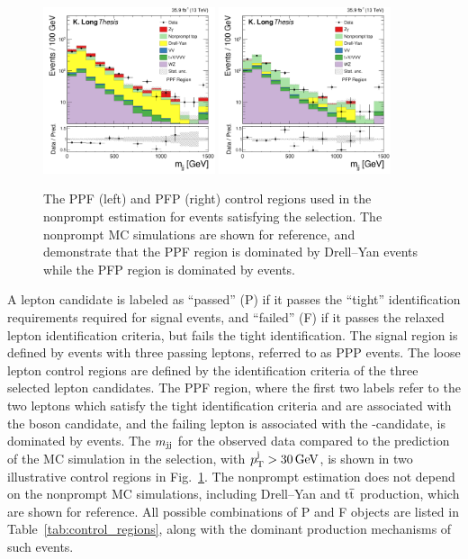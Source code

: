 \begin{figure}[htbp]
  \centering
   \includegraphics[width=0.45\textwidth]{figures/AnalysisProcedure/mjj_PPF.pdf}
   \includegraphics[width=0.45\textwidth]{figures/AnalysisProcedure/mjj_PFP.pdf}
  \caption{
    The PPF (left) and PFP (right) control regions used in the nonprompt estimation
    for events satisfying the \WZjj selection.
    The nonprompt MC simulations are shown for reference, and demonstrate that the
    PPF region is dominated by Drell--Yan events while the PFP region
    is dominated by {\ttbar} events.
        }
 \label{fig:nonpromptBackgroundCRs}
\end{figure}

A lepton candidate is labeled as ``passed'' (P) if it passes the ``tight'' identification
requirements required for signal events, 
and ``failed'' (F) if it passes the relaxed lepton identification criteria, 
but fails the tight identification. The signal region is defined by events 
with three passing leptons, referred to as PPP events. 
The loose lepton control regions are defined by the identification
criteria of the three selected lepton candidates. 
The PPF region, where the first
two labels refer to the two leptons which satisfy the tight identification criteria and are
associated with the \PZ boson candidate, and the failing lepton is associated with
the \cPW-candidate, is dominated by {\Zpj} events.
The $m_{\mathrm{jj}}$ for the observed data compared to the prediction of the MC simulation
in the \WZjj selection, with $p_{\mathrm{T}}^{\mathrm{j}} > 30\,\text{Ge\hspace{-.08em}V}$, is shown in two illustrative control regions 
in Fig.~\ref{fig:nonpromptBackgroundCRs}. The nonprompt estimation does not depend on the 
nonprompt MC simulations, including Drell--Yan and ${\mathrm{t}\overline{\mathrm{t}}}$ production, which are shown for reference.
All possible combinations of P and F objects are listed in Table~\ref{tab:control_regions},
along with the dominant production mechanisms of such events.

